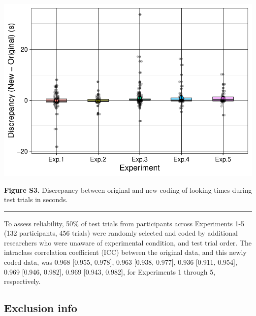 \documentclass[]{article}
\begin{document}
\includegraphics{lumi_analysis_files/figure-latex/rel_plot-1.pdf}

\textbf{Figure S3.} Discrepancy between original and new coding of
looking times during test trials in seconds.

\begin{center}\rule{0.5\linewidth}{\linethickness}\end{center}

To assess reliability, 50\% of test trials from participants across
Experiments 1-5 (132 participants, 456 trials) were randomly selected
and coded by additional researchers who were unaware of experimental
condition, and test trial order. The intraclass correlation coefficient
(ICC) between the original data, and this newly coded data, was 0.968
{[}0.955, 0.978{]}, 0.963 {[}0.938, 0.977{]}, 0.936 {[}0.911, 0.954{]},
0.969 {[}0.946, 0.982{]}, 0.969 {[}0.943, 0.982{]}, for Experiments 1
through 5, respectively.

\subsection{Exclusion info}\label{exclusion-info}
\end{document}
